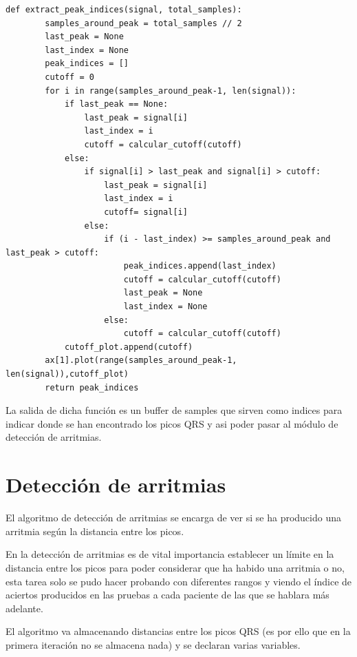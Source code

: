 \lstset{language=python, breaklines=true, basicstyle=\footnotesize}
\begin{lstlisting}[frame=single]
    def extract_peak_indices(signal, total_samples):
        samples_around_peak = total_samples // 2
        last_peak = None
        last_index = None
        peak_indices = []
        cutoff = 0
        for i in range(samples_around_peak-1, len(signal)):
            if last_peak == None:
                last_peak = signal[i]
                last_index = i
                cutoff = calcular_cutoff(cutoff)
            else:
                if signal[i] > last_peak and signal[i] > cutoff:
                    last_peak = signal[i]
                    last_index = i
                    cutoff= signal[i]
                else:
                    if (i - last_index) >= samples_around_peak and last_peak > cutoff:
                        peak_indices.append(last_index)
                        cutoff = calcular_cutoff(cutoff)
                        last_peak = None
                        last_index = None         
                    else:
                        cutoff = calcular_cutoff(cutoff)
            cutoff_plot.append(cutoff)
        ax[1].plot(range(samples_around_peak-1, len(signal)),cutoff_plot)
        return peak_indices
\end{lstlisting}

La salida de dicha función es un buffer de samples que sirven como indices para indicar donde se han encontrado
los picos QRS y asi poder pasar al módulo de detección de arritmias.

\section{Detección de arritmias}

El algoritmo de detección de arritmias se encarga de ver si se ha producido una arritmia según la
distancia entre los picos.

En la detección de arritmias es de vital importancia establecer un límite en la distancia entre los picos
para poder considerar que ha habido una arritmia o no, esta tarea solo se pudo hacer probando con diferentes
rangos y viendo el índice de aciertos producidos en las pruebas a cada paciente de las que se hablara más adelante. 

El algoritmo va almacenando distancias entre los picos QRS (es por ello que en la primera iteración no se almacena nada)
y se declaran varias variables.

